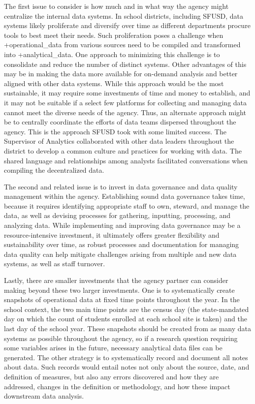 \documentclass[
]{book}
\begin{document}
The first issue to consider is how much and in what way the agency might centralize the internal data systems. In school districts, including SFUSD, data systems likely proliferate and diversify over time as different departments procure tools to best meet their needs. Such proliferation poses a challenge when +operational\_data\textbar{} from various sources need to be compiled and transformed into +analytical\_data\textbar. One approach to minimizing this challenge is to consolidate and reduce the number of distinct systems. Other advantages of this may be in making the data more available for on-demand analysis and better aligned with other data systems. While this approach would be the most sustainable, it may require some investments of time and money to establish, and it may not be suitable if a select few platforms for collecting and managing data cannot meet the diverse needs of the agency. Thus, an alternate approach might be to centrally coordinate the efforts of data teams dispersed throughout the agency. This is the approach SFUSD took with some limited success. The Supervisor of Analytics collaborated with other data leaders throughout the district to develop a common culture and practices for working with data. The shared language and relationships among analysts facilitated conversations when compiling the decentralized data.

The second and related issue is to invest in data governance and data quality management within the agency. Establishing sound data governance takes time, because it requires identifying appropriate staff to own, steward, and manage the data, as well as devising processes for gathering, inputting, processing, and analyzing data. While implementing and improving data governance may be a resource-intensive investment, it ultimately offers greater flexibility and sustainability over time, as robust processes and documentation for managing data quality can help mitigate challenges arising from multiple and new data systems, as well as staff turnover.

Lastly, there are smaller investments that the agency partner can consider making beyond these two larger investments. One is to systematically create snapshots of operational data at fixed time points throughout the year. In the school context, the two main time points are the census day (the state-mandated day on which the count of students enrolled at each school site is taken) and the last day of the school year. These snapshots should be created from as many data systems as possible throughout the agency, so if a research question requiring some variables arises in the future, necessary analytical data files can be generated. The other strategy is to systematically record and document all notes about data. Such records would entail notes not only about the source, date, and definition of measures, but also any errors discovered and how they are addressed, changes in the definition or methodology, and how these impact downstream data analysis.
\end{document}
